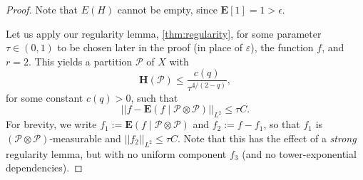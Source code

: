 \documentclass[reqno,11pt]{amsart}
\theoremstyle{definition}
\theoremstyle{remark}
\numberwithin{equation}{section}
\renewcommand{\H}{\mathbf{H}}
\newcommand{\E}{\mathbf{E}}
\newcommand{\mP}{\mathcal{P}}
\newcommand{\eps}{\varepsilon}
\begin{document}
\begin{proof}
Note that $E(H)$ cannot be empty, since $\E[1] = 1 > \epsilon$. %

Let us apply our regularity lemma, \cref{thm:regularity}, for some parameter $\tau \in (0, 1)$ to be chosen later in the proof (in place of $\eps$), the function $f$, and $r = 2$. This yields a partition $\mP$ of $X$ with 
\[
    \H(\mP) \le \frac{c(q)}{\tau^{4/(2-q)}},
\]
for some constant $c(q) > 0$, such that
\[
    ||f - \E(f \mid \mP \otimes \mP)||_{L^2} \le \tau C.
\]
For brevity, we write $f_1 := \E(f \mid \mP \otimes \mP)$ and $f_2 := f - f_1$, so that $f_1$ is $(\mP \otimes \mP)$-measurable and $||f_2||_{L^2} \le \tau C$. Note that this has the effect of a \emph{strong} regularity lemma, but with no uniform component $f_3$ (and no tower-exponential dependencies).


\end{proof}
\end{document}
